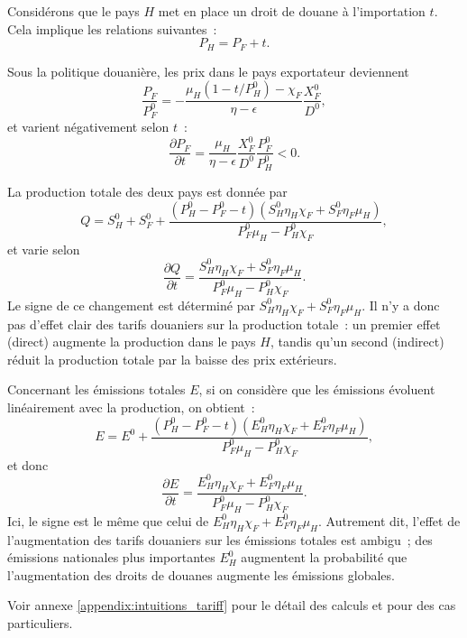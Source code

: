 Considérons que le pays $H$ met en place un droit de douane à l'importation $t$. Cela implique les relations suivantes~:
$$
    P_H = P_F + t.
$$

Sous la politique douanière, les prix dans le pays exportateur deviennent
$$
    \frac{P_F}{P_F^0} = -\frac{\mu_H (1 - t/P_H^0) - \chi_F}{\eta - \epsilon}\frac{X_F^0}{D^0},
$$
et varient négativement selon $t$~:
$$
    \frac{\partial P_F}{\partial t} = \frac{\mu_H}{\eta - \epsilon} \frac{X_F^0}{D^0} \frac{P_F^0}{P_H^0} < 0.
$$

La production totale des deux pays est donnée par
$$
    Q = S_H^0 + S_F^0 + \frac{(P_H^0 - P_F^0 - t)(S_H^0 \eta_H \chi_F + S_F^0 \eta_F \mu_H)}{P_F^0 \mu_H - P_H^0 \chi_F},
$$
et varie selon
$$
    \frac{\partial Q}{\partial t} = \frac{S_H^0 \eta_H \chi_F + S_F^0 \eta_F \mu_H}{P_F^0 \mu_H - P_H^0 \chi_F}.
$$
Le signe de ce changement est déterminé par $S_H^0 \eta_H \chi_F + S_F^0 \eta_F \mu_H$. Il n'y a donc pas d'effet clair des tarifs douaniers sur la production totale~: un premier effet (direct) augmente la production dans le pays $H$, tandis qu'un second (indirect) réduit la production totale par la baisse des prix extérieurs.

Concernant les émissions totales $E$, si on considère que les émissions évoluent linéairement avec la production, on obtient~:
$$
    E = E^0 + \frac{(P_H^0 - P_F^0 - t)(E_H^0 \eta_H \chi_F + E_F^0 \eta_F \mu_H)}{P_F^0 \mu_H - P_H^0 \chi_F},
$$
et donc
$$
    \frac{\partial E}{\partial t} = \frac{E_H^0 \eta_H \chi_F + E_F^0 \eta_F \mu_H}{P_F^0 \mu_H - P_H^0 \chi_F}.
$$
Ici, le signe est le même que celui de $E_H^0 \eta_H \chi_F + E_F^0 \eta_F \mu_H$. Autrement dit, l'effet de l'augmentation des tarifs douaniers sur les émissions totales est ambigu~; des émissions nationales plus importantes $E_H^0$ augmentent la probabilité que l'augmentation des droits de douanes augmente les émissions globales.

Voir annexe \ref{appendix:intuitions_tariff} pour le détail des calculs et pour des cas particuliers.
